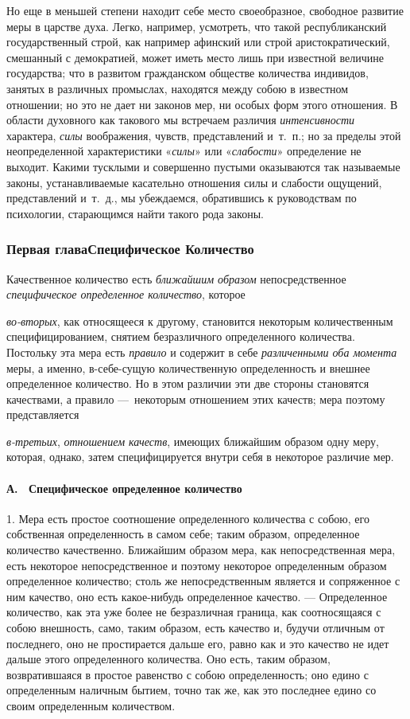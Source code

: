 Но еще в меньшей степени находит себе место своеобразное, свободное развитие
меры в царстве духа. Легко, например, усмотреть, что такой республиканский
государственный строй, как например афинский или строй аристократический,
смешанный с демократией, может иметь место лишь при известной величине
государства; что в развитом гражданском обществе количества индивидов,
занятых в различных промыслах, находятся между собою в известном отношении;
но это не дает ни законов мер, ни особых форм этого отношения. В области
духовного как такового мы встречаем различия
{\em интенсивности} характера,
{\em силы} воображения, чувств, представлений и~т.~п.;
но за пределы этой неопределенной характеристики
«{\em силы}» или «{\em слабости}»
определение не выходит. Какими тусклыми и совершенно пустыми оказываются
так называемые законы, устанавливаемые касательно отношения силы и слабости
ощущений, представлений и~т.~д., мы убеждаемся, обратившись к руководствам
по психологии, старающимся найти такого рода законы.

\subsubsection{Первая главаСпецифическое Количество}
Качественное количество есть
{\em ближайшим образом} непосредственное
{\em специфическое определенное количество}, которое

{\em во-вторых}, как относящееся к другому, становится
некоторым количественным специфицированием, снятием безразличного
определенного количества. Постольку эта мера есть
{\em правило} и содержит в себе
{\em различенными оба момента} меры, а именно,
в-себе-сущую количественную определенность и внешнее определенное
количество. Но в этом различии эти две стороны становятся качествами, а
правило —~некоторым отношением этих качеств; мера поэтому представляется

{\em в-третьих}, {\em отношением
качеств}, имеющих ближайшим образом одну меру, которая, однако, затем
специфицируется внутри себя в некоторое различие мер.

\paragraph[А. \ Специфическое определенное количество]{А. \ Специфическое
определенное количество}
\hypertarget{Toc478978672}{}1. Мера есть простое соотношение определенного
количества с собою, его собственная определенность в самом себе; таким
образом, определенное количество качественно. Ближайшим образом мера, как
непосредственная мера, есть некоторое непосредственное и поэтому некоторое
определенным образом определенное количество; столь же непосредственным
является и сопряженное с ним качество, оно есть какое-нибудь определенное
качество. — Определенное количество, как эта уже более не безразличная
граница, как соотносящаяся с собою внешность, само, таким образом, есть
качество и, будучи отличным от последнего, оно не простирается дальше его,
равно как и это качество не идет дальше этого определенного количества. Оно
есть, таким образом, возвратившаяся в простое равенство с собою
определенность; оно едино с определенным наличным бытием, точно так же, как
это последнее едино со своим определенным количеством.

